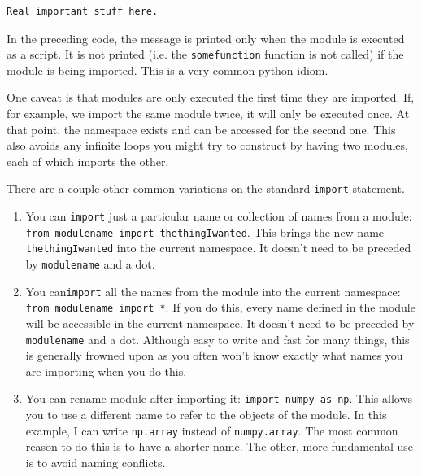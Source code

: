 \begin{Verbatim}
Real important stuff here.
\end{Verbatim}


In the preceding code, the message is printed only when the module is executed as a script.  It is not printed (i.e. the \texttt{somefunction} function is not called) if the module is being imported.  This is a very common python idiom.


One caveat is that modules are only executed the first time they are imported.  If, for example, we import the same module twice, it will only be executed once.  At that point, the namespace exists and can be accessed for the second one.  This also avoids any infinite loops you might try to construct by having two modules, each of which imports the other.


There are a couple other common variations on the standard \texttt{import} statement.

\begin{enumerate}

\item You can \texttt{import} just a particular name or collection of names from a module: \texttt{from modulename import thethingIwanted}.  This brings the new name \texttt{thethingIwanted} into the current namespace.  It doesn’t need to be preceded by \texttt{modulename} and a dot.

\item You can\texttt{import} all the names from the module into the current namespace: \texttt{from modulename import *}.  If you do this, every name defined in the module will be accessible in the current namespace.  It doesn’t need to be preceded by \texttt{modulename} and a dot.  Although easy to write and fast for many things, this is generally frowned upon as you often won’t know exactly what names you are importing when you do this.

\item You can rename module after importing it: \texttt{import numpy as np}.  This allows you to use a different name to refer to the objects of the module.  In this example, I can write \texttt{np.array} instead of \texttt{numpy.array}.  The most common reason to do this is to have a shorter name.  The other, more fundamental use is to avoid naming conflicts.

\end{enumerate}